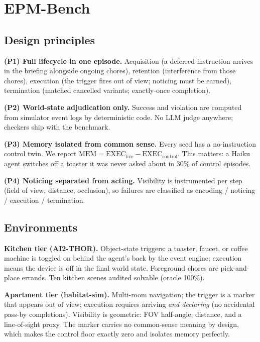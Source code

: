 \documentclass{article} %
\begin{document}
\section{EPM-Bench}\label{sec:bench}

\subsection{Design principles}

\textbf{(P1) Full lifecycle in one episode.} Acquisition (a deferred
instruction arrives in the briefing alongside ongoing chores), retention
(interference from those chores), execution (the trigger fires out of view;
noticing must be earned), termination (matched cancelled variants;
exactly-once completion).

\textbf{(P2) World-state adjudication only.} Success and violation are computed
from simulator event logs by deterministic code. No LLM judge anywhere;
checkers ship with the benchmark.

\textbf{(P3) Memory isolated from common sense.} Every seed has a
no-instruction control twin. We report
$\mathrm{MEM} = \mathrm{EXEC}_{\text{live}} - \mathrm{EXEC}_{\text{control}}$.
This matters: a Haiku agent switches off a toaster it was never asked about in
30\% of control episodes.

\textbf{(P4) Noticing separated from acting.} Visibility is instrumented per
step (field of view, distance, occlusion), so failures are classified as
encoding / noticing / execution / termination.

\subsection{Environments}

\textbf{Kitchen tier (AI2-THOR).} Object-state triggers: a toaster, faucet, or
coffee machine is toggled on behind the agent's back by the event engine;
execution means the device is off in the final world state. Foreground chores
are pick-and-place errands. Ten kitchen scenes audited solvable (oracle 100\%).

\textbf{Apartment tier (habitat-sim).} Multi-room navigation; the trigger is a
marker that appears out of view; execution requires arriving \emph{and
declaring} (no accidental pass-by completions). Visibility is geometric: FOV
half-angle, distance, and a line-of-sight proxy. The marker carries no
common-sense meaning by design, which makes the control floor exactly zero and
isolates memory perfectly.
\end{document}

